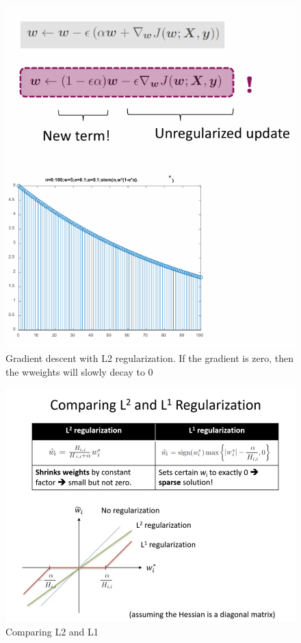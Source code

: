\documentclass[../Main.tex]{subfiles}
\begin{document}
\begin{figure}[H]
    \centering
    \includegraphics[width=0.75\linewidth]{Images/deepl/l2-regularization.png}
    \caption{Gradient descent with L2 regularization. If the gradient is zero, then the wweights will slowly decay to 0}
\end{figure}


\begin{figure}[H]
    \centering
    \includegraphics[width=0.75\linewidth]{Images/deepl/l-comparison.png}
    \caption{Comparing L2 and L1}
\end{figure}
\end{document}
